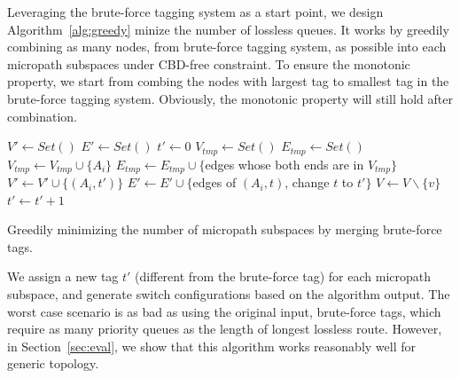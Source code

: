 

 Leveraging the brute-force tagging system as a start point, we design Algorithm~\ref{alg:greedy} minize the 
number of lossless queues. It works by greedily combining as many nodes, from brute-force tagging system, 
as possible into each micropath subspaces under CBD-free constraint. To ensure the monotonic property, we start 
from combing the nodes with largest tag to smallest tag in the brute-force tagging system.
Obviously, the monotonic property will still hold after combination. 


\begin{algorithm}
	\small
	$V' \gets Set()$\;
	$E' \gets Set()$\;
	$t' \gets 0$\;
	 {
		$V_{tmp} \gets Set()$\;
		$E_{tmp} \gets Set()$\;
		 {
			$V_{tmp} \gets V_{tmp} \cup \{A_i\}$\;
			$E_{tmp} \gets E_{tmp} \cup \{$edges whose both ends are in $V_{tmp}\}$\;
			 {
				$V' \gets V' \cup \{(A_i, t')\}$\;
				$E' \gets E' \cup \{$edges of $(A_i, t)$, change $t$ to $t'\}$\; 
			}
			$V \gets V \backslash \{v\}$ \;
		}
		 {
			$t' \gets t'+1$\;
		}
	}
	\;
    \caption{Greedily minimizing the number of micropath subspaces by merging brute-force tags.}
	\label{alg:greedy}
\end{algorithm}

We assign a new tag $t'$ (different from the brute-force tag) for each micropath subspace, and generate switch configurations
based on the algorithm output. The worst case scenario is as bad as using the original input, brute-force tags, which require
as many priority queues as the length of longest lossless route. However,
in Section~\ref{sec:eval}, we show that this algorithm works reasonably well for generic topology. 


%	
%
%	


